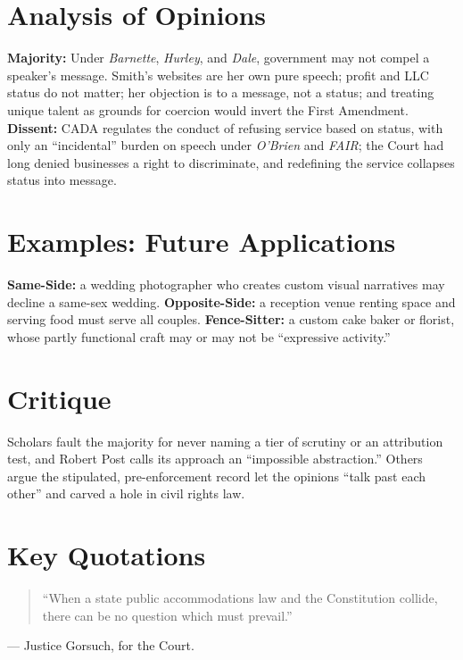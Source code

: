 \documentclass[12pt]{article}
\begin{document}
\section{Analysis of Opinions}
\textbf{Majority:} Under \textit{Barnette}, \textit{Hurley}, and \textit{Dale}, government may not compel a speaker's message. Smith's websites are her own pure speech; profit and LLC status do not matter; her objection is to a message, not a status; and treating unique talent as grounds for coercion would invert the First Amendment. \textbf{Dissent:} CADA regulates the conduct of refusing service based on status, with only an ``incidental'' burden on speech under \textit{O'Brien} and \textit{FAIR}; the Court had long denied businesses a right to discriminate, and redefining the service collapses status into message.

\section{Examples: Future Applications}
\textbf{Same-Side:} a wedding photographer who creates custom visual narratives may decline a same-sex wedding. \textbf{Opposite-Side:} a reception venue renting space and serving food must serve all couples. \textbf{Fence-Sitter:} a custom cake baker or florist, whose partly functional craft may or may not be ``expressive activity.''

\section{Critique}
Scholars fault the majority for never naming a tier of scrutiny or an attribution test, and Robert Post calls its approach an ``impossible abstraction.'' Others argue the stipulated, pre-enforcement record let the opinions ``talk past each other'' and carved a hole in civil rights law.

\section{Key Quotations}
\begin{quote}
``When a state public accommodations law and the Constitution collide, there can be no question which must prevail.''
\end{quote}
\noindent --- Justice Gorsuch, for the Court.
\end{document}
